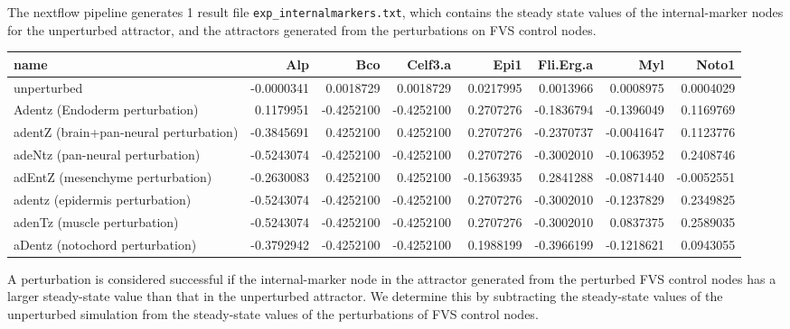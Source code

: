 \documentclass[
]{book}
\begin{document}
The nextflow pipeline generates 1 result file \texttt{exp\_internalmarkers.txt}, which contains the steady state values of the internal-marker nodes for the unperturbed attractor, and the attractors generated from the perturbations on FVS control nodes.

\begin{table}
\centering\begingroup\fontsize{8}{10}\selectfont

\begin{tabular}{l|r|r|r|r|r|r|r}
\hline
name & Alp & Bco & Celf3.a & Epi1 & Fli.Erg.a & Myl & Noto1\\
\hline
unperturbed & -0.0000341 & 0.0018729 & 0.0018729 & 0.0217995 & 0.0013966 & 0.0008975 & 0.0004029\\
\hline
Adentz (Endoderm perturbation) & 0.1179951 & -0.4252100 & -0.4252100 & 0.2707276 & -0.1836794 & -0.1396049 & 0.1169769\\
\hline
adentZ (brain+pan-neural perturbation) & -0.3845691 & 0.4252100 & 0.4252100 & 0.2707276 & -0.2370737 & -0.0041647 & 0.1123776\\
\hline
adeNtz (pan-neural perturbation) & -0.5243074 & -0.4252100 & -0.4252100 & 0.2707276 & -0.3002010 & -0.1063952 & 0.2408746\\
\hline
adEntZ (mesenchyme perturbation) & -0.2630083 & 0.4252100 & 0.4252100 & -0.1563935 & 0.2841288 & -0.0871440 & -0.0052551\\
\hline
adentz (epidermis perturbation) & -0.5243074 & -0.4252100 & -0.4252100 & 0.2707276 & -0.3002010 & -0.1237829 & 0.2349825\\
\hline
adenTz (muscle perturbation) & -0.5243074 & -0.4252100 & -0.4252100 & 0.2707276 & -0.3002010 & 0.0837375 & 0.2589035\\
\hline
aDentz (notochord perturbation) & -0.3792942 & -0.4252100 & -0.4252100 & 0.1988199 & -0.3966199 & -0.1218621 & 0.0943055\\
\hline
\end{tabular}
\endgroup{}
\end{table}

A perturbation is considered successful if the internal-marker node in the attractor generated from the perturbed FVS control nodes has a larger steady-state value than that in the unperturbed attractor. We determine this by subtracting the steady-state values of the unperturbed simulation from the steady-state values of the perturbations of FVS control nodes.
\end{document}
